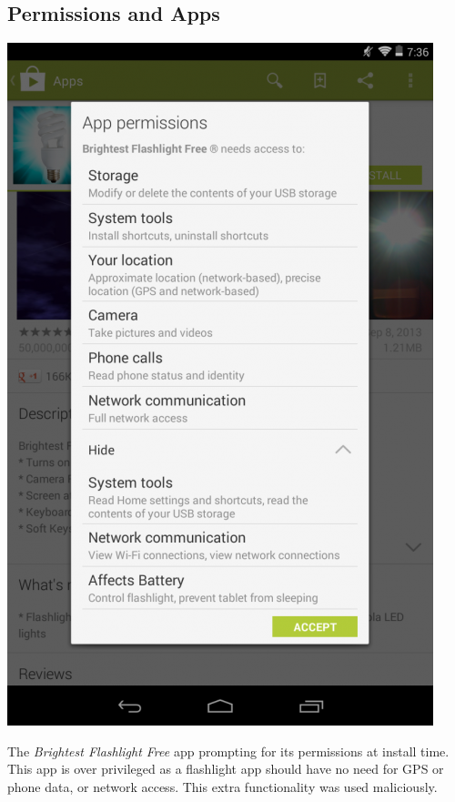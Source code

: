 \documentclass[a4paper]{article}
\begin{document}
\subsection{Permissions and Apps}

\begin{marginfigure}
  \centering
  \includegraphics[width=\marginlength]{img/brightestflashlight.png}
  \caption{The \emph{Brightest Flashlight Free} app prompting for its permissions
    at install time. This app is over privileged as a flashlight app should have
    no need for GPS or phone data, or network access.  This extra functionality
  was used maliciously.}
\label{img:brightestflashlight}
\end{marginfigure}
\end{document}
